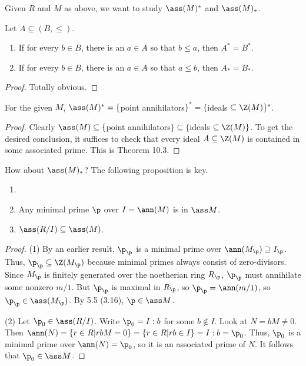  Given $R$ and $M$ as above, we want to study $\ass(M)^*$ and $\ass(M)_*$.
 \begin{lemma}
   Let $A\subseteq (B,\le)$.
   \begin{enumerate}
     \item If for every $b\in B$, there is an $a\in A$ so that $b\le a$, then $A^*=B^*$.
     \item If for every $b\in B$, there is an $a\in A$ so that $a\le b$, then $A_*=B_*$.
   \end{enumerate}
 \end{lemma}
 \begin{proof}
   Totally obvious.
 \end{proof}
 \begin{theorem}
   For the given $M$, $\ass (M)^*=\{$point annihilators$\}^*=\{$ideals $\subseteq
   \Z(M)\}^*$.
 \end{theorem}
 \begin{proof}
   Clearly $\ass (M)\subseteq \{$point annihilators$\}\subseteq \{$ideals $\subseteq
   \Z(M)\}$. To get the desired conclusion, it suffices to check that every ideal
   $A\subseteq \Z(M)$ is contained in some associated prime. This is Theorem 10.3.
 \end{proof}
 How about $\ass(M)_*$? The following proposition is key.
 \begin{proposition} \label{lec10P:minlAss}
  \begin{enumerate}
   \item[]
   \item Any minimal prime $\p$ over $I=\ann (M)$ is in $\ass M$.
   \item $\ass (R/I)\subseteq \ass (M)$.
  \end{enumerate}
 \end{proposition}
 \begin{proof}
   (1) By an earlier result, $\p_\p$ is a minimal prime over $\ann(M_\p)\supseteq I_\p$.
   Thus, $\p_\p\subseteq \Z(M_\p)$ because minimal primes always consist of
   zero-divisors. Since $M_\p$ is finitely generated over the noetherian ring $R_\p$,
   $\p_\p$ must annihilate some nonzero $m/1$. But $\p_\p$ is maximal in $R_\p$, so
   $\p_\p=\ann (m/1)$, so $\p_\p\in \ass (M_\p)$. By 5.5 (3.16), $\p\in \ass M$.

   (2) Let $\p_0\in \ass (R/I)$. Write $\p_0 = I:b$ for some $b\not\in I$. Look at
   $N=bM\neq 0$. Then $\ann (N)=\{r\in R|rbM=0\} = \{r\in R|rb\in I\}=I:b = \p_0$. Thus,
   $\p_0$ is a minimal prime over $\ann(N)=\p_0$, so it is an associated prime of $N$. It
   follows that $\p_0\in \ass M$.
 \end{proof}

